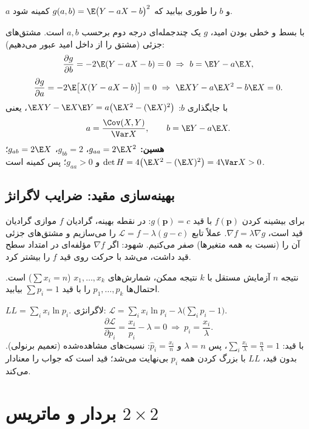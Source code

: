 \begin{example}
$a$ و $b$ را طوری بیابید که $g(a,b)=\E\big(Y-aX-b\big)^2$ کمینه شود.
\begin{solution}
با بسط و خطی بودن امید، $g$ یک چندجمله‌ای درجه دوم برحسب $a,b$ است. مشتق‌های جزئی (مشتق را از داخل امید عبور می‌دهیم):
\[
\frac{\partial g}{\partial b}=-2\E(Y-aX-b)=0\ \Rightarrow\ b=\E Y-a\E X,
\]
\[
\frac{\partial g}{\partial a}=-2\E\big[X(Y-aX-b)\big]=0\ \Rightarrow\ \E XY-a\E X^2-b\E X=0 .
\]
با جایگذاری $b$: $\E XY-\E X\E Y=a\big(\E X^2-(\E X)^2\big)$، یعنی
\[
a=\frac{\Cov(X,Y)}{\Var X},\qquad b=\E Y-a\E X .
\]
\textbf{هسین:} $g_{aa}=2\E X^2$، $g_{bb}=2$، $g_{ab}=2\E X$؛ $\det H=4\big(\E X^2-(\E X)^2\big)=4\Var X>0$ و $g_{aa}>0$؛ پس کمینه است.
\end{solution}
\end{example}

\subsection{بهینه‌سازی مقید: ضرایب لاگرانژ}
برای بیشینه کردن $f(\mathbf p)$ با قید $g(\mathbf p)=c$: در نقطه بهینه، گرادیان $f$ موازی گرادیان قید است، $\nabla f=\lambda\nabla g$. عملاً تابع $\mathcal L=f-\lambda(g-c)$ را می‌سازیم و مشتق‌های جزئی آن را (نسبت به همه متغیرها) صفر می‌کنیم. شهود: اگر $\nabla f$ مؤلفه‌ای در امتداد سطح قید داشت، می‌شد با حرکت روی قید $f$ را بیشتر کرد.

\begin{example}
نتیجه $n$ آزمایش مستقل با $k$ نتیجه ممکن، شمارش‌های $x_1,\ldots,x_k$ ($\sum x_i=n$) است.  احتمال‌ها $p_1,\ldots,p_k$ را با قید $\sum p_i=1$ بیابید.
\begin{solution}
$LL=\sum_ix_i\ln p_i$. لاگرانژی: $\mathcal L=\sum_ix_i\ln p_i-\lambda\big(\sum_ip_i-1\big)$.
\[
\frac{\partial\mathcal L}{\partial p_i}=\frac{x_i}{p_i}-\lambda=0\ \Rightarrow\ p_i=\frac{x_i}{\lambda}.
\]
با قید: $\sum_i\frac{x_i}{\lambda}=\frac n\lambda=1$، پس $\lambda=n$ و $\hat p_i=\frac{x_i}{n}$: نسبت‌های مشاهده‌شده (تعمیم  برنولی). بدون قید، $LL$ با بزرگ کردن همه $p_i$ بی‌نهایت می‌شد؛ قید است که جواب را معنادار می‌کند.
\end{solution}
\end{example}

\section{بردار و ماتریس $2\times2$}

